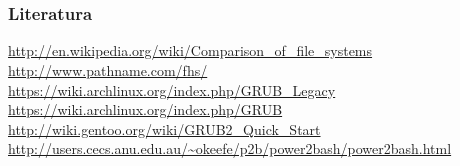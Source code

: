 \documentclass[t]{beamer}
\begin{document}
\section*{}
\begin{frame}
	\frametitle{Literatura}
	\url{http://en.wikipedia.org/wiki/Comparison_of_file_systems}\\
	\url{http://www.pathname.com/fhs/}\\
	\vfill
	\url{https://wiki.archlinux.org/index.php/GRUB_Legacy}\\
	\url{https://wiki.archlinux.org/index.php/GRUB}\\
	\url{http://wiki.gentoo.org/wiki/GRUB2_Quick_Start}\\
	\vfill
	\url{http://users.cecs.anu.edu.au/~okeefe/p2b/power2bash/power2bash.html}\\
\end{frame}
\end{document}
